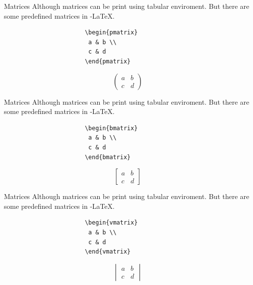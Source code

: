 \documentclass[10pt]{beamer}
\begin{document}
\begin{frame}[fragile]{Matrices }
Although matrices can be print using tabular enviroment. But there are some predefined matrices in \AmS-\LaTeX.

\begin{verbatim}
                       \begin{pmatrix}
                        a & b \\ 
                        c & d 
                       \end{pmatrix}
\end{verbatim}

$$\begin{pmatrix}a & b \\ c & d \end{pmatrix}$$
\end{frame}
\begin{frame}[fragile]{Matrices }
Although matrices can be print using tabular enviroment. But there are some predefined matrices in \AmS-\LaTeX.
\begin{verbatim}
                       \begin{bmatrix}
                        a & b \\ 
                        c & d 
                       \end{bmatrix}
\end{verbatim}

$$\begin{bmatrix}a & b \\ c & d \end{bmatrix}$$
\end{frame}
\begin{frame}[fragile]{Matrices }
Although matrices can be print using tabular enviroment. But there are some predefined matrices in \AmS-\LaTeX.
\begin{verbatim}
                       \begin{vmatrix}
                        a & b \\ 
                        c & d 
                       \end{vmatrix}
\end{verbatim}  

$$\begin{vmatrix}a & b \\ c & d \end{vmatrix}$$
\end{frame}
\end{document}

